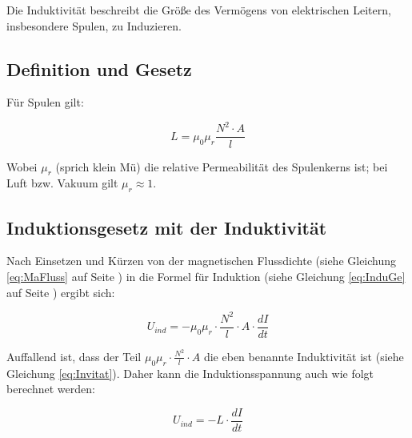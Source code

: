 Die Induktivität beschreibt die Größe des Vermögens von elektrischen Leitern, insbesondere Spulen, zu Induzieren.

\subsection{Definition und Gesetz}

Für Spulen gilt:

\begin{equation} \label{eq:Invitat}
	L = \mu_0 \mu_r \frac{N^2 \cdot A}{l}
\end{equation}

Wobei $\mu_r$ (sprich \glqq klein Mü\grqq ) die relative Permeabilität des Spulenkerns ist; bei Luft bzw. Vakuum gilt $ \mu_r \approx 1$. 


\subsection{Induktionsgesetz mit der Induktivität}

Nach Einsetzen und Kürzen von der magnetischen Flussdichte (siehe Gleichung \ref{eq:MaFluss} auf Seite \pageref{eq:MaFluss}) in die Formel für Induktion (siehe Gleichung \ref{eq:InduGe} auf Seite \pageref{eq:InduGe}) ergibt sich:

\begin{equation}
	U_{ind} = - \mu_0 \mu_r \cdot \frac{N^2}{l}
				\cdot A \cdot \frac{dI}{dt}
\end{equation}

Auffallend ist, dass der Teil $\mu_0 \mu_r \cdot \frac{N^2}{l} \cdot A$ die eben benannte Induktivität ist (siehe Gleichung \ref{eq:Invitat}). Daher kann die Induktionsspannung auch wie folgt berechnet werden:

\begin{equation}
	U_{ind} = - L \cdot \frac{dI}{dt}
\end{equation}